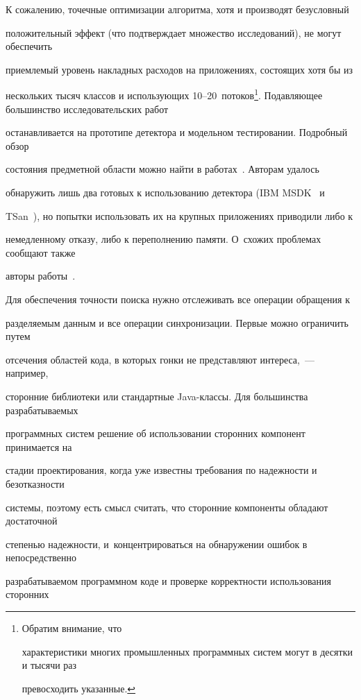\vspace*{-2pt}



  К сожалению, точечные оптимизации алгоритма, хотя и производят безусловный

положительный эффект (что подтверждает множество исследований), не могут обеспечить

приемлемый уровень накладных расходов на приложениях, состоящих хотя бы из

нескольких тысяч классов и использующих 10--20~потоков\footnote{Обратим внимание, что

характеристики многих промышленных программных систем могут в десятки и тысячи раз

превосходить указанные.}. Подавляющее большинство исследовательских работ

останавливается на прототипе детектора и модельном тестировании. Подробный обзор

состояния предметной области можно найти в работах~\cite{17-ts, 16-ts}. Авторам удалось

обнаружить лишь два готовых к использованию детектора (IBM MSDK~\cite{10-ts} и

TSan~\cite{12-ts}), но попытки использовать их на крупных приложениях приводили либо к

немедленному отказу, либо к переполнению памяти. О~схожих проблемах сообщают также

авторы работы~\cite{9-ts}.



  Для обеспечения точности поиска нужно отслеживать все операции обращения к

разделяемым данным и все операции синхронизации. Первые можно ограничить путем

отсечения областей кода, в которых гонки не представляют интереса,~--- например,

сторонние библиотеки или стандартные Java-клас\-сы. Для большинства разрабатываемых

программных систем решение об использовании сторонних компонент принимается на

стадии проектирования, когда уже известны требования по надежности и безотказности

сис\-те\-мы, поэтому есть смысл считать, что сторонние компоненты обладают достаточной

степенью надежности, и~кон\-центрироваться на обнаружении ошибок в непосредственно

разрабатываемом программном коде и проверке корректности использования сторонних


